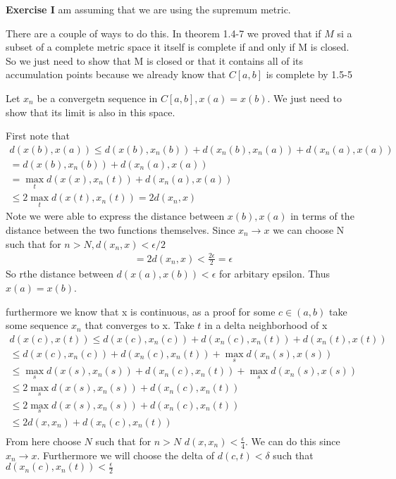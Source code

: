 \documentclass[12pt]{article}
\newenvironment{exercise}[1]{\vspace{.1in}\noindent\textbf{Exercise #1 \hspace{.05em}}}{}
\begin{document}
\begin{exercise}{5.8}
	I am assuming that we are using the supremum metric.

	There are a couple of ways to do this. In theorem 1.4-7 we proved that if $M$ si a subset of a complete metric space it itself is complete if and only if M is closed. So we just need to show that M is closed or that it contains all of its accumulation points because we already know that $C[a,b]$ is complete by 1.5-5

	Let $x_n$ be a convergetn sequence in $C[a,b],x(a)=x(b)$. We just need to show that its limit is also in this space.

	First note that
	\begin{align}
		d(x(b),x(a))\leq d(x(b),x_n(b))+d(x_n(b),x_n(a))+d(x_n(a),x(a)) \\
		= d(x(b),x_n(b))+d(x_n(a),x(a))                                 \\
		= \max_t d(x(x),x_n(t))+d(x_n(a),x(a))                          \\
		\leq 2\max_t d(x(t),x_n(t)) = 2d(x_n,x)
	\end{align}
	Note we were able to express the distance between $x(b),x(a)$ in terms of the distance between the two functions themselves. Since $x_n\rightarrow x$ we can choose N such that for $n>N,d(x_n,x)<\epsilon/2$
	\begin{align}
		= 2d(x_n,x)
		< \frac{2\epsilon}{2}=\epsilon
	\end{align}
	So rthe distance between $d(x(a),x(b))<\epsilon$ for arbitary epsilon. Thus $x(a)=x(b)$.

	furthermore we know that x is continuous, as a proof for some $c\in (a,b)$ take some sequence $x_n$ that converges to x. Take $t$ in a delta neighborhood of x
	\begin{align}
		d(x(c),x(t))\leq d(x(c),x_n(c))+d(x_n(c),x_n(t))+d(x_n(t),x(t))  \\
		\leq  d(x(c),x_n(c))+d(x_n(c),x_n(t))+\max_sd(x_n(s),x(s))       \\
		\leq  \max_sd(x(s),x_n(s))+d(x_n(c),x_n(t))+\max_sd(x_n(s),x(s)) \\
		\leq  2\max_sd(x(s),x_n(s))+d(x_n(c),x_n(t))                     \\
		\leq  2\max_sd(x(s),x_n(s))+d(x_n(c),x_n(t))                     \\
		\leq  2d(x,x_n)+d(x_n(c),x_n(t))                                 \\
	\end{align}
	From here choose $N$ such that for $n>N$ $d(x,x_n)< \frac{\epsilon}{4}$. We can do this since $x_n\rightarrow x$. Furthermore we will choose the delta of $d(c,t)<\delta$ such that $d(x_n(c),x_n(t))<\frac{\epsilon}{2}$


\end{exercise}
\end{document}
